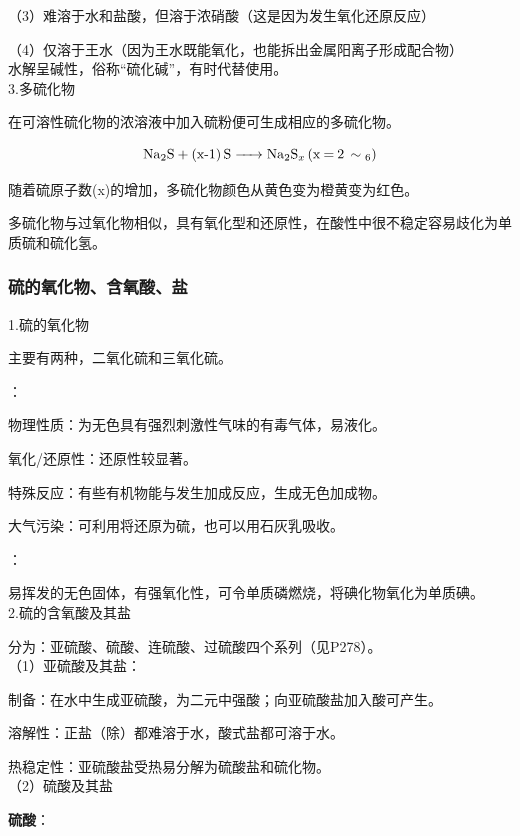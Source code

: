 \documentclass[a4paper,UTF8]{article}
\begin{document}
（3）难溶于水和盐酸，但溶于浓硝酸（这是因为发生氧化还原反应）

（4）仅溶于王水（因为王水既能氧化，也能拆出金属阳离子形成配合物）\\

水解呈碱性，俗称“硫化碱”，有时代替使用。\\

3.多硫化物

在可溶性硫化物的浓溶液中加入硫粉便可生成相应的多硫化物。

$$ \ce{Na2S + (x-1)S -> Na2S_x (x = 2\sim 6)} $$

随着硫原子数(x)的增加，多硫化物颜色从黄色变为橙黄变为红色。

多硫化物与过氧化物相似，具有氧化型和还原性，在酸性中很不稳定容易歧化为单质硫和硫化氢。

\subsubsection{硫的氧化物、含氧酸、盐}

1.硫的氧化物

主要有两种，二氧化硫和三氧化硫。

：

物理性质：为无色具有强烈刺激性气味的有毒气体，易液化。

氧化/还原性：还原性较显著。

特殊反应：有些有机物能与发生加成反应，生成无色加成物。

大气污染：可利用将还原为硫，也可以用石灰乳吸收。

：

易挥发的无色固体，有强氧化性，可令单质磷燃烧，将碘化物氧化为单质碘。\\

2.硫的含氧酸及其盐

分为：亚硫酸、硫酸、连硫酸、过硫酸四个系列（见P278）。\\

（1）亚硫酸及其盐：

制备：在水中生成亚硫酸，为二元中强酸；向亚硫酸盐加入酸可产生。

溶解性：正盐（除）都难溶于水，酸式盐都可溶于水。

热稳定性：亚硫酸盐受热易分解为硫酸盐和硫化物。\\

（2）硫酸及其盐

\textbf{硫酸}：\\
\end{document}
